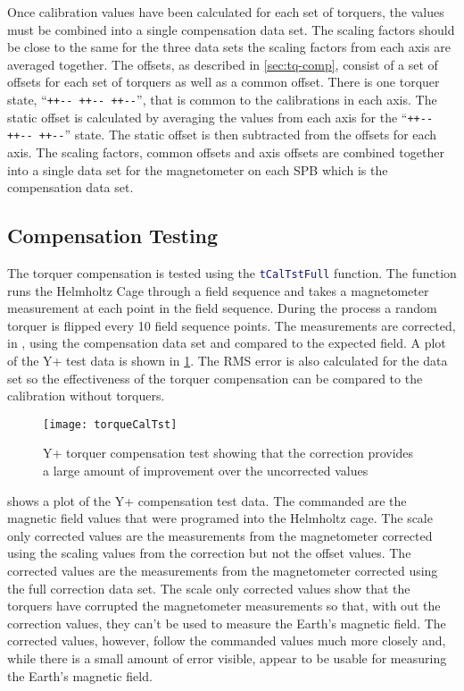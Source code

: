Once calibration values have been calculated for each set of torquers, the values must be combined into a single compensation data set. The scaling factors should be close to the same for the three data sets the scaling factors from each axis are averaged together. The offsets, as described in \cref{sec:tq-comp}, consist of a set of offsets for each set of torquers as well as a common offset. There is one torquer state, ``\texttt{++-{}- ++-{}- ++-{}-}'', that is common to the calibrations in each axis. The static offset is calculated by averaging the values from each axis for the ``\texttt{++-{}- ++-{}- ++-{}-}'' state. The static offset is then subtracted from the offsets for each axis. The scaling factors, common offsets and axis offsets are combined together into a single data set for the magnetometer on each \ac{SPB} which is the compensation data set.

\subsection{Compensation Testing}
\label{sec:tq-comp-tst}

The torquer compensation is tested using the \lstinline[style=code,language=Matlab]$tCalTstFull$ function. The function runs the Helmholtz Cage through a field sequence and takes a magnetometer measurement at each point in the field sequence. During the process a random torquer is flipped every 10 field sequence points. The measurements are corrected, in \matlab, using the compensation data set and compared to the expected field. A plot of the Y+ test data is shown in \cref{fig:tqtst}. The RMS error is also calculated for the data set so the effectiveness of the torquer compensation can be compared to the calibration without torquers.

\begin{figure}[!ht]
    \centering
    \texttt{[image: torqueCalTst]}
    \caption{Y+ torquer compensation test showing that the correction provides a large amount of improvement over the uncorrected values}
    \label{fig:tqtst}
\end{figure}

 shows a plot of the Y+ compensation test data. The commanded are the magnetic field values that were programed into the Helmholtz cage. The scale only corrected values are the measurements from the magnetometer corrected using the scaling values from the correction but not the offset values. The corrected values are the measurements from the magnetometer corrected using the full correction data set. The scale only corrected values show that the torquers have corrupted the magnetometer measurements so that, with out the correction values, they can't be used to measure the Earth's magnetic field. The corrected values, however, follow the commanded values much more closely and, while there is a small amount of error visible, appear to be usable for measuring the Earth's magnetic field.

